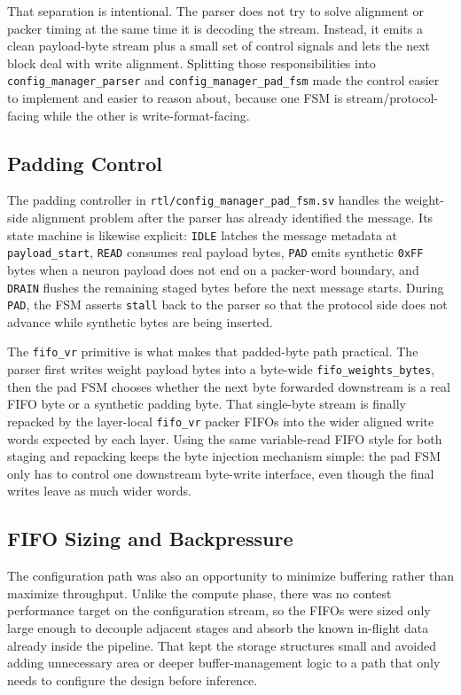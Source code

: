 That separation is intentional. The parser does not try to solve alignment or
packer timing at the same time it is decoding the stream. Instead, it emits a
clean payload-byte stream plus a small set of control signals and lets the next
block deal with write alignment. Splitting those responsibilities into
\texttt{config\_manager\_parser} and \texttt{config\_manager\_pad\_fsm} made the
control easier to implement and easier to reason about, because one FSM is
stream/protocol-facing while the other is write-format-facing.

\subsection{Padding Control}

The padding controller in \texttt{rtl/config\_manager\_pad\_fsm.sv} handles the
weight-side alignment problem after the parser has already identified the
message. Its state machine is likewise explicit: \texttt{IDLE} latches the
message metadata at \texttt{payload\_start}, \texttt{READ} consumes real payload
bytes, \texttt{PAD} emits synthetic \texttt{0xFF} bytes when a neuron payload
does not end on a packer-word boundary, and \texttt{DRAIN} flushes the
remaining staged bytes before the next message starts. During \texttt{PAD}, the
FSM asserts \texttt{stall} back to the parser so that the protocol side does
not advance while synthetic bytes are being inserted.

The \texttt{fifo\_vr} primitive is what makes that padded-byte path practical.
The parser first writes weight payload bytes into a byte-wide
\texttt{fifo\_weights\_bytes}, then the pad FSM chooses whether the next byte
forwarded downstream is a real FIFO byte or a synthetic padding byte. That
single-byte stream is finally repacked by the layer-local \texttt{fifo\_vr}
packer FIFOs into the wider aligned write words expected by each layer. Using
the same variable-read FIFO style for both staging and repacking keeps the byte
injection mechanism simple: the pad FSM only has to control one downstream
byte-write interface, even though the final writes leave as much wider words.

\subsection{FIFO Sizing and Backpressure}

The configuration path was also an opportunity to minimize buffering rather
than maximize throughput. Unlike the compute phase, there was no contest
performance target on the configuration stream, so the FIFOs were sized only
large enough to decouple adjacent stages and absorb the known in-flight data
already inside the pipeline. That kept the storage structures small and avoided
adding unnecessary area or deeper buffer-management logic to a path that only
needs to configure the design before inference.

